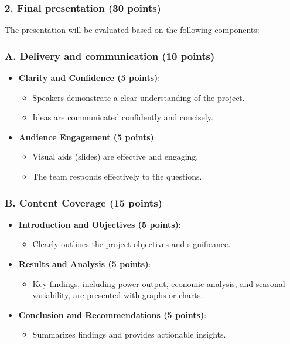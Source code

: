 \documentclass[11pt]{article}
\begin{document}
\subsubsection*{2. Final presentation (30 points)}
The presentation will be evaluated based on the following components:

\subsubsection*{A. Delivery and communication (10 points)}
\begin{itemize}
    \item \textbf{Clarity and Confidence (5 points)}:
    \begin{itemize}
        \item Speakers demonstrate a clear understanding of the project.
        \item Ideas are communicated confidently and concisely.
    \end{itemize}
    \item \textbf{Audience Engagement (5 points)}:
    \begin{itemize}
        \item Visual aids (slides) are effective and engaging.
        \item The team responds effectively to the questions.
    \end{itemize}
\end{itemize}

\subsubsection*{B. Content Coverage (15 points)}
\begin{itemize}
    \item \textbf{Introduction and Objectives (5 points)}:
    \begin{itemize}
        \item Clearly outlines the project objectives and significance.
    \end{itemize}
    \item \textbf{Results and Analysis (5 points)}:
    \begin{itemize}
        \item Key findings, including power output, economic analysis, and seasonal variability, are presented with graphs or charts.
    \end{itemize}
    \item \textbf{Conclusion and Recommendations (5 points)}:
    \begin{itemize}
        \item Summarizes findings and provides actionable insights.
    \end{itemize}
\end{itemize}
\end{document}
